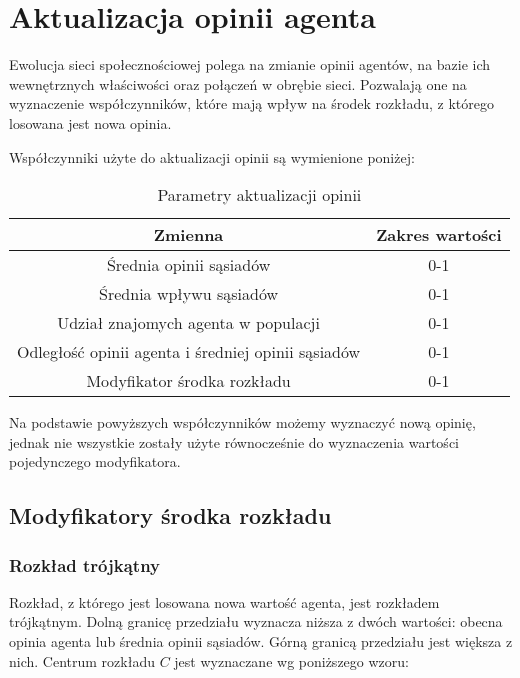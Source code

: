 \section{Aktualizacja opinii agenta}
Ewolucja sieci społecznościowej polega na zmianie opinii agentów, na bazie ich wewnętrznych właściwości oraz połączeń w obrębie sieci.
Pozwalają one na wyznaczenie współczynników, które mają wpływ na środek rozkładu, z którego losowana jest nowa opinia.

Współczynniki użyte do aktualizacji opinii są wymienione poniżej:
\begin{table}[htbp]
    \centering
    \begin{tabular}{c|c}
        \hline
        Zmienna                                            & Zakres wartości \\
        \hline
        Średnia opinii sąsiadów                            & 0-1             \\
        Średnia wpływu sąsiadów                            & 0-1             \\
        Udział znajomych agenta w populacji                & 0-1             \\
        Odległość opinii agenta i średniej opinii sąsiadów & 0-1             \\
        Modyfikator środka rozkładu                        & 0-1             \\
    \end{tabular}
    \caption{Parametry aktualizacji opinii}
    \label{tab:opinion_update_parameters}
\end{table}

Na podstawie powyższych współczynników możemy wyznaczyć nową opinię,
jednak nie wszystkie zostały użyte równocześnie do wyznaczenia wartości pojedynczego modyfikatora.

\subsection{Modyfikatory środka rozkładu}

\subsubsection{Rozkład trójkątny}
Rozkład, z którego jest losowana nowa wartość agenta, jest rozkładem trójkątnym.
Dolną granicę przedziału wyznacza niższa z dwóch wartości: obecna opinia agenta lub średnia opinii sąsiadów.
Górną granicą przedziału jest większa z nich.
Centrum rozkładu $C$ jest wyznaczane wg poniższego wzoru:

